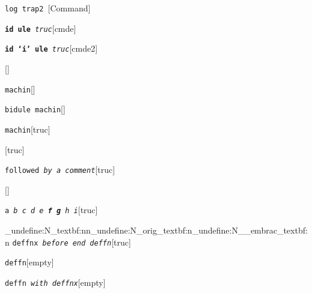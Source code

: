 \documentclass{book}
\begin{document}
%
\noindent\texttt{log trap2 \EmbracOn{}\textnormal{\textsl{}}\EmbracOff{}}\hfill[Command]



%
\noindent\texttt{\textbf{id ule} \EmbracOn{}\textnormal{\textsl{truc}}\EmbracOff{}}\hfill[cmde]



%
\noindent\texttt{\textbf{id `\texttt{i}' ule} \EmbracOn{}\textnormal{\textsl{truc}}\EmbracOff{}}\hfill[cmde2]



%
\noindent\texttt{}\hfill[]



\noindent\texttt{machin}\hfill[]



%
\noindent\texttt{bidule machin}\hfill[]



%
\noindent\texttt{machin}\hfill[truc]



%
\noindent\texttt{}\hfill[truc]



\noindent\texttt{followed \EmbracOn{}\textnormal{\textsl{by a comment}}\EmbracOff{}}\hfill[truc]



%
\noindent\texttt{}\hfill[]



\noindent\texttt{a \EmbracOn{}\textnormal{\textsl{b c d e \textbf{f g} h i}}\EmbracOff{}}\hfill[truc]


\ExplSyntaxOn%
\cs_undefine:N{\embrac_textbf:nn}\cs_undefine:N{\embrac_orig_textbf:n}\cs_undefine:N{\__embrac_textbf:n}%
\ExplSyntaxOff%
%
\noindent\texttt{deffnx \EmbracOn{}\textnormal{\textsl{before end deffn}}\EmbracOff{}}\hfill[truc]



%


\noindent\texttt{deffn}\hfill[empty]



%

\noindent\texttt{deffn \EmbracOn{}\textnormal{\textsl{with deffnx}}\EmbracOff{}}\hfill[empty]
\end{document}
